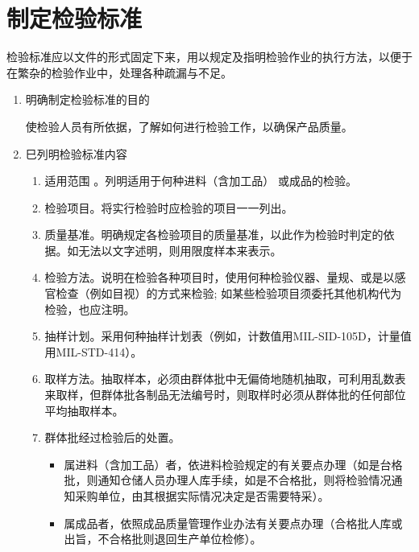 \section {制定检验标准}

    检验标准应以文件的形式固定下来，用以规定及指明检验作业的执行方法，以便于在繁杂的检验作业中，处理各种疏漏与不足。

    \begin{enumerate}

    \item 明确制定检验标准的目的

        使检验人员有所依据，了解如何进行检验工作，以确保产品质量。

    \item 巳列明检验标准内容

        \begin{enumerate}
            \item 适用范围 。列明适用于何种进料（含加工品） 或成品的检验。

            \item 检验项目。将实行检验时应检验的项目一一列出。

            \item 质量基准。明确规定各检验项目的质量基准，以此作为检验时判定的依据。如无法以文字述明，则用限度样本来表示。

            \item 检验方法。说明在检验各种项目时，使用何种检验仪器、量规、或是以感官检查（例如目视）的方式来检验; 如某些检验项目须委托其他机构代为检验，也应注明。

            \item 抽样计划。采用何种抽样计划表（例如，计数值用MIL-SID-105D，计量值用MIL-STD-414）。

            \item 取样方法。抽取样本，必须由群体批中无偏倚地随机抽取，可利用乱数表来取样，但群体批各制品无法编号时，则取样时必须从群体批的任何部位平均抽取样本。

            \item 群体批经过检验后的处置。
                \begin{itemize}
                    \item 属进料（含加工品）者，依进料检验规定的有关要点办理（如是台格批，则通知仓储人员办理人库手续，如是不合格批，则将检验情况通知采购单位，由其根据实际情况决定是否需要特采）。

                    \item 属成品者，依照成品质量管理作业办法有关要点办理（合格批人库或出旨，不合格批则退回生产单位检修）。


\end{itemize}
\end{enumerate}
\end{enumerate}
